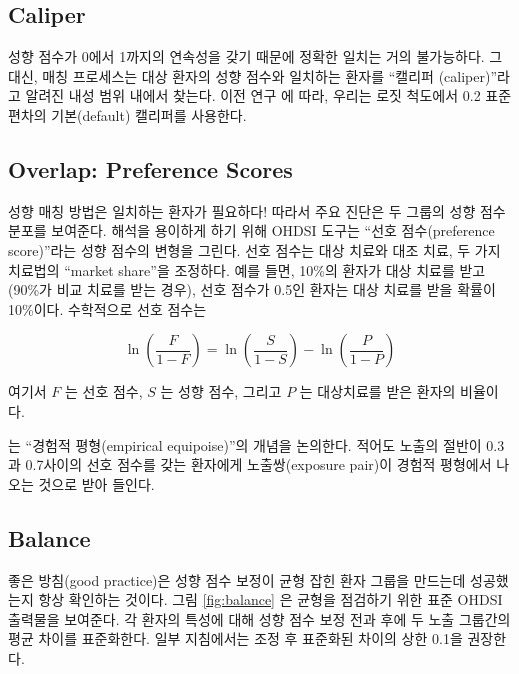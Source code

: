 \documentclass[11pt]{book}
\theoremstyle{definition}
\theoremstyle{definition}
\theoremstyle{definition}
\theoremstyle{remark}
\begin{document}
\subsection{Caliper}\label{caliper}


성향 점수가 0에서 1까지의 연속성을 갖기 때문에 정확한 일치는 거의
불가능하다. 그 대신, 매칭 프로세스는 대상 환자의 성향 점수와 일치하는
환자를 ``캘리퍼 (caliper)''라고 알려진 내성 범위 내에서 찾는다. 이전
연구 \citep{austin_2011}에 따라, 우리는 로짓 척도에서 0.2 표준편차의
기본(default) 캘리퍼를 사용한다.

\subsection{Overlap: Preference Scores}\label{overlap-preference-scores}


성향 매칭 방법은 일치하는 환자가 필요하다! 따라서 주요 진단은 두 그룹의
성향 점수 분포를 보여준다. 해석을 용이하게 하기 위해 OHDSI 도구는 ``선호
점수(preference score)''라는 성향 점수의 변형을
그린다.\citep{walker_2013} 선호 점수는 대상 치료와 대조 치료, 두 가지
치료법의 ``market share''을 조정하다. 예를 들면, 10\%의 환자가 대상
치료를 받고(90\%가 비교 치료를 받는 경우), 선호 점수가 0.5인 환자는 대상
치료를 받을 확률이 10\%이다. 수학적으로 선호 점수는

\[\ln\left(\frac{F}{1-F}\right)=\ln\left(\frac{S}{1-S}\right)-\ln\left(\frac{P}{1-P}\right)\]

여기서 \(F\) 는 선호 점수, \(S\) 는 성향 점수, 그리고 \(P\) 는
대상치료를 받은 환자의 비율이다.

\citet{walker_2013} 는 ``경험적 평형(empirical equipoise)''의 개념을
논의한다. 적어도 노출의 절반이 0.3과 0.7사이의 선호 점수를 갖는 환자에게
노출쌍(exposure pair)이 경험적 평형에서 나오는 것으로 받아 들인다.

\subsection{Balance}\label{balance}

 

좋은 방침(good practice)은 성향 점수 보정이 균형 잡힌 환자 그룹을
만드는데 성공했는지 항상 확인하는 것이다. 그림 \ref{fig:balance} 은
균형을 점검하기 위한 표준 OHDSI 출력물을 보여준다. 각 환자의 특성에 대해
성향 점수 보정 전과 후에 두 노출 그룹간의 평균 차이를 표준화한다. 일부
지침에서는 조정 후 표준화된 차이의 상한 0.1을 권장한다.
\citep{rubin_2001}
\end{document}
